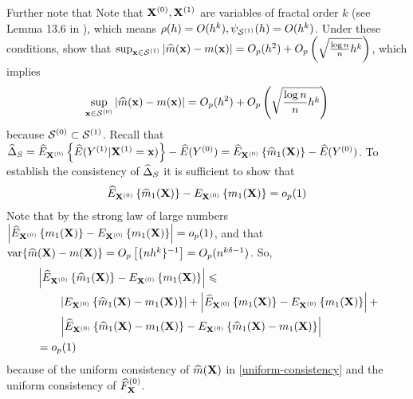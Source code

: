 \documentclass[useAMS,usenatbib,referee]{biom}
\begin{document}
Further note that Note that ${\bf X}^{(0)}, {\bf X}^{(1)}$ are variables of fractal order $k$ (see Lemma 13.6 in \citet{ferraty2006nonparametric}), which means $\rho(h) = O(h^k), \psi_{\suppxo}(h) = O(h^k)$. Under these conditions, \citet{ferraty2010rate} show that 
    $\sup_{\bx \in \suppxo} | \mhat(\bx) - m(\bx)| = O_p(h^2) + O_p\left(\sqrt{\frac{\log n}{n}h^k}\right)$,
which implies 
\begin{align}\label{uniform-consistency}
    \sup_{\bx \in \suppxz} | \mhat(\bx) - m(\bx)| = O_p(h^2) + O_p\left(\sqrt{\frac{\log n}{n}h^k}\right)
\end{align}
because $\suppxz \subset \suppxo$.
Recall that ${\widehat\Delta}_S = {\widehat E}_{{\bf X}^{(0)}}\left \{ {\widehat E}(Y^{(1)}| {\bf X}^{(1)} ={\bf x})\right \} - {\widehat E}(Y^{(0)}) = {\widehat E}_{{\bf X}^{(0)}}\left \{ {\widehat m}_1({\bf X})\right \} - {\widehat E}(Y^{(0)})$. To establish the consistency of ${\widehat\Delta}_S$ it is sufficient to show that 
\begin{align*}
    {\widehat E}_{{\bf X}^{(0)}}\left \{ {\widehat m}_1({\bf X})\right \} - E_{{\bf X}^{(0)}}\left \{ m_1({\bf X})\right \} = o_p(1)
\end{align*}
Note that by the strong law of large numbers $\left|{\widehat E}_{{\bf X}^{(0)}}\left \{ m_1({\bf X})\right \} - E_{{\bf X}^{(0)}}\left \{ m_1({\bf X})\right \}\right| = o_p(1)$, and that $\mbox{var}\{{\widehat m}({\bf X}) - m({\bf X})\} = O_p\left[\{nh^k\}^{-1}\right] = O_p(n^{k\delta - 1})$. So,
\begin{align*}
    &\left|{\widehat E}_{{\bf X}^{(0)}}\left \{ {\widehat m}_1({\bf X})\right \} - E_{{\bf X}^{(0)}}\left \{ m_1({\bf X})\right \}\right| \leqslant\\ &\qquad\left|E_{{\bf X}^{(0)}}\left \{ {\widehat m}_1({\bf X}) - m_1({\bf X})\right\}\right| + \left|{\widehat E}_{{\bf X}^{(0)}}\left \{ m_1({\bf X})\right \} - E_{{\bf X}^{(0)}}\left \{ m_1({\bf X})\right \}\right| +\\ &\qquad\left|{\widehat E}_{{\bf X}^{(0)}}\left \{ {\widehat m}_1({\bf X}) - m_1({\bf X})\right\} - E_{{\bf X}^{(0)}}\left \{ {\widehat m}_1({\bf X}) - m_1({\bf X})\right\}\right|\\
    &= o_p(1)
\end{align*}
because of the uniform consistency of ${\widehat m}({\bf X})$ in \eqref{uniform-consistency} and the uniform consistency of ${\widehat F}_{\bf X}^{(0)}$.
\end{document}
